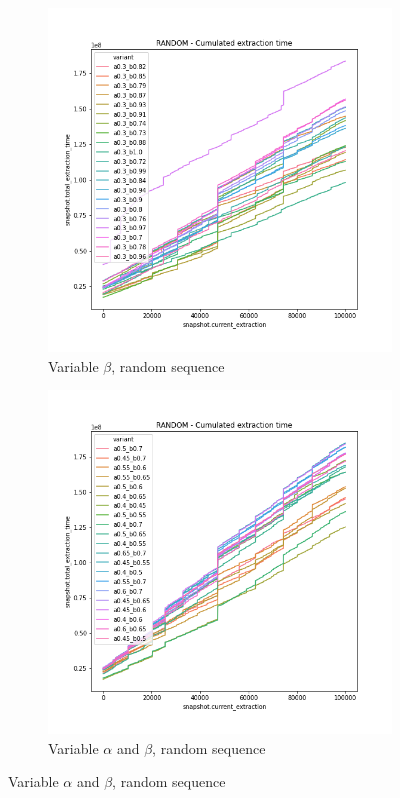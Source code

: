\begin{figure}
\begin{subfigure}[b]{0.32\textwidth}
        \includegraphics[width=\textwidth]{./fragments/04_experimental_execution/images/04_alphabeta_detail_random_right.png.0_0.png}
        \caption{Variable $\beta$, random sequence}
        \label{FIG:05_ALPHABETA_BENCHMARK_RANDOM_RIGHT}
    \end{subfigure}
    \hfill
    \begin{subfigure}[b]{0.32\textwidth}
        \centering
        \includegraphics[width=\textwidth]{./fragments/04_experimental_execution/images/04_alphabeta_detail_random_inner.png.0_0.png}
        \caption{Variable $\alpha$ and $\beta$, random sequence}
        \label{FIG:05_ALPHABETA_BENCHMARK_RANDOM_INNER}
    \end{subfigure}
    \vfill
    

\end{figure}
